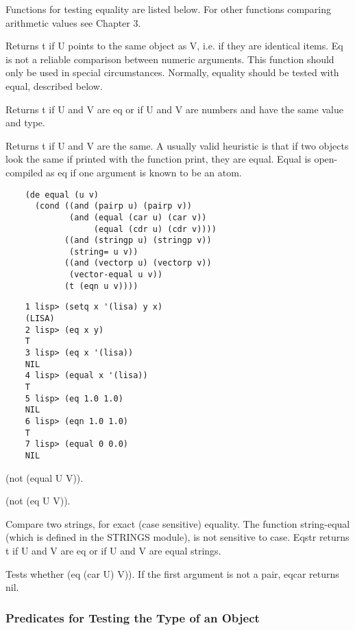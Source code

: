   Functions  for  testing  equality are listed below.  For other
functions comparing arithmetic values see Chapter 3.


{    Returns t if U points to  the same object as V, i.e. if they
    are identical items.    Eq  is  not  a  reliable  comparison
    between  numeric  arguments.    This function should only be
    used in special circumstances.  Normally, equality should be
    tested with equal, described below.
}

{    Returns t if U and V  are eq or if U  and V are numbers  and
    have the same value and type.
}

{    Returns  t  if  U  and  V  are  the  same.   A usually valid
    heuristic is that if two objects look the  same  if  printed
    with   the  function  print,  they  are  equal.    Equal  is
    open-compiled as eq if one argument is known to be an atom.
}
\begin{verbatim}
    (de equal (u v)
      (cond ((and (pairp u) (pairp v))
             (and (equal (car u) (car v))
                  (equal (cdr u) (cdr v))))
            ((and (stringp u) (stringp v))
             (string= u v))
            ((and (vectorp u) (vectorp v))
             (vector-equal u v))
            (t (eqn u v))))
\end{verbatim}
\begin{verbatim}
    1 lisp> (setq x '(lisa) y x)
    (LISA)
    2 lisp> (eq x y)
    T
    3 lisp> (eq x '(lisa))
    NIL
    4 lisp> (equal x '(lisa))
    T
    5 lisp> (eq 1.0 1.0)
    NIL
    6 lisp> (eqn 1.0 1.0)
    T
    7 lisp> (equal 0 0.0)
    NIL
\end{verbatim}
{    (not (equal U V)).  }

{    (not (eq U V)).  }

{    Compare two strings, for exact  (case  sensitive)  equality.
    The  function  string-equal (which is defined in the STRINGS
    module), is not sensitive to case.  Eqstr returns t if U and
    V are eq or if U and V are equal strings.  }

{    Tests whether (eq (car U) V)).  If the first argument is not
    a pair, eqcar returns nil.  }

\subsubsection{Predicates for Testing the Type of an Object}

